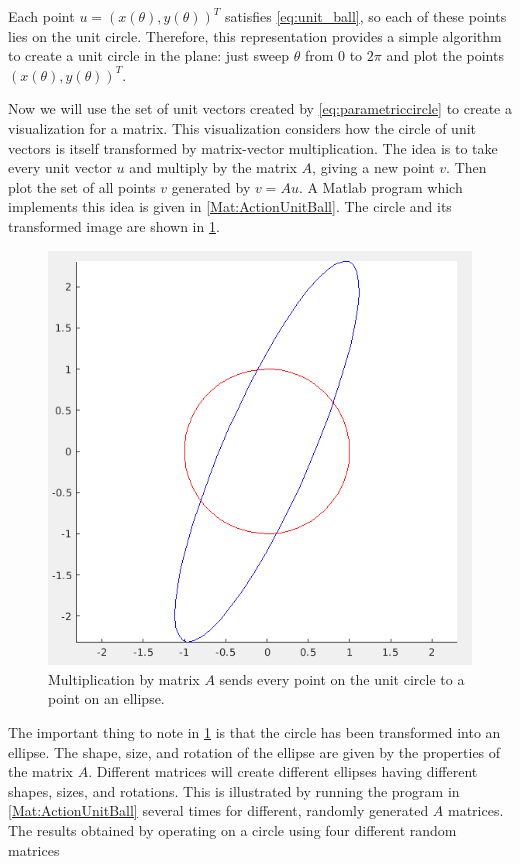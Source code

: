 \documentclass[onefignum,onetabnum]{siamart190516}
\begin{document}
Each point $u = (x(\theta), y(\theta))^T$ 
satisfies \cref{eq:unit_ball}, so each of these points lies on the
unit circle.  Therefore, this representation provides a
simple algorithm to create a unit circle in the plane:  just sweep 
$\theta$ from $0$ to $2\pi$ and plot the points $(x(\theta), y(\theta))^T$.

Now we will use the set of unit vectors created by \eqref{eq:parametriccircle}
to create a visualization for a matrix.
This visualization considers how the circle of unit vectors is itself
transformed by matrix-vector multiplication.  The idea is to take
every unit vector $u$ and multiply by the matrix $A$, giving a
new point $v$.  Then plot the set of all points $v$ generated by $v = A u$.  
A Matlab program which implements this idea is given in \cref{Mat:ActionUnitBall}.  The circle and its
transformed image are shown in \cref{fig:CircleTransformedToEllipse}.
\begin{figure}[thb]
	\centering
	\includegraphics[width=0.7\columnwidth]{CircleTransformedToEllipse.png}
	\caption{Multiplication by matrix $A$ sends every point on the unit circle to a point on an ellipse.}
	\label{fig:CircleTransformedToEllipse}
\end{figure}
The important thing to note in \cref{fig:CircleTransformedToEllipse} is that the circle has been
transformed into an ellipse.  The shape, size, and rotation of the ellipse are given
by the properties of the matrix $A$.  Different matrices will create different
ellipses having different shapes, sizes, and rotations.  This is illustrated
by running the program in \cref{Mat:ActionUnitBall} several times for different, randomly generated
$A$ matrices.  The results obtained by operating on a circle using four different random matrices 
\end{document}
